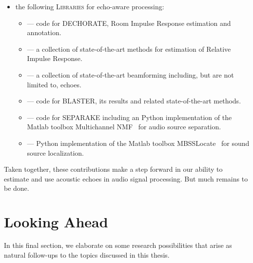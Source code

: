 \begin{itemize}
    \item the following \textsc{Libraries} for echo-aware processing:
    \begin{itemize}
        \item {} --- code for \acs{DECHORATE}, Room Impulse Response estimation and annotation.
        \item {} --- a collection of state-of-the-art methods for estimation of Relative Impulse Response.
        \item {} --- a collection of state-of-the-art beamforming including, but are not limited to, echoes.
        \item {} --- code for \acs{BLASTER}, its results and related state-of-the-art methods.
        \item {} --- code for \acs{SEPARAKE} including an Python implementation of the Matlab toolbox Multichannel NMF~ for audio source separation.
        \item {} --- Python implementation of the Matlab toolbox MBSSLocate~ for sound source localization.

    \end{itemize}

\end{itemize}

\mynewline
Taken together, these contributions make a step forward in our ability to estimate and use acoustic echoes in audio signal processing.
But much remains to be done.

\section{Looking Ahead}
In this final section, we elaborate on some research possibilities that arise as natural follow-ups to the topics discussed in this thesis.

